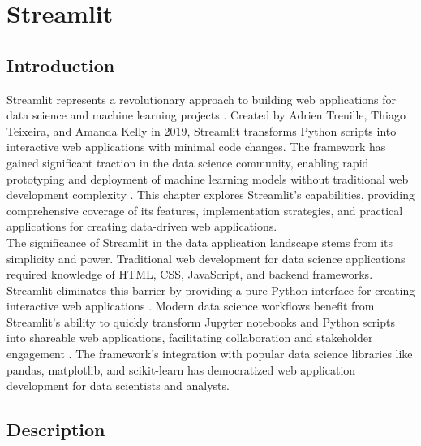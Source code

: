 %
%
%


%
%

\chapter{Streamlit}
\label{ch:streamlit}

\section{Introduction}
\label{sec:intro}

Streamlit represents a revolutionary approach to building web applications for data science and machine learning projects \cite{Streamlit:2024}. Created by Adrien Treuille, Thiago Teixeira, and Amanda Kelly in 2019, Streamlit transforms Python scripts into interactive web applications with minimal code changes. The framework has gained significant traction in the data science community, enabling rapid prototyping and deployment of machine learning models without traditional web development complexity \cite{Chen:2023}. This chapter explores Streamlit's capabilities, providing comprehensive coverage of its features, implementation strategies, and practical applications for creating data-driven web applications.\\

The significance of Streamlit in the data application landscape stems from its simplicity and power. Traditional web development for data science applications required knowledge of HTML, CSS, JavaScript, and backend frameworks. Streamlit eliminates this barrier by providing a pure Python interface for creating interactive web applications \cite{Streamlit:2024}. Modern data science workflows benefit from Streamlit's ability to quickly transform Jupyter notebooks and Python scripts into shareable web applications, facilitating collaboration and stakeholder engagement \cite{Towards:2023}. The framework's integration with popular data science libraries like pandas, matplotlib, and scikit-learn has democratized web application development for data scientists and analysts.\\

\section{Description}
\label{sec:description}

